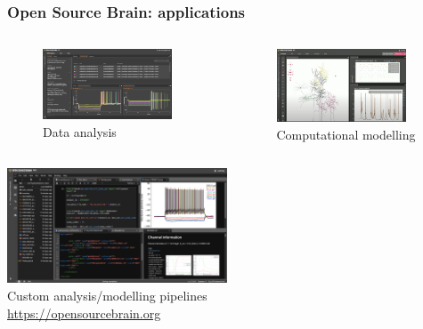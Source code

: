 \begin{frame}[c]
  \frametitle{Open Source Brain: applications}
  \begin{columns}
    \begin{column}{0.5\textwidth}
      \begin{figure}[h]
        \centering
        \includegraphics[keepaspectratio,width=0.9\textwidth]{./99_images/nwbe}\\
        \large{Data analysis}
      \end{figure}%
    \end{column}
    \begin{column}{0.5\textwidth}
      \begin{figure}[h]
        \centering
        \includegraphics[keepaspectratio,width=0.9\textwidth]{./99_images/Netpyne}\\
        \large{Computational modelling}
      \end{figure}%
    \end{column}
  \end{columns}
  \begin{center}
    \includegraphics[keepaspectratio,width=0.49\textwidth]{./99_images/jlab}\\
    \large{Custom analysis/modelling pipelines}\\
    \url{https://opensourcebrain.org}
  \end{center}
\end{frame}
